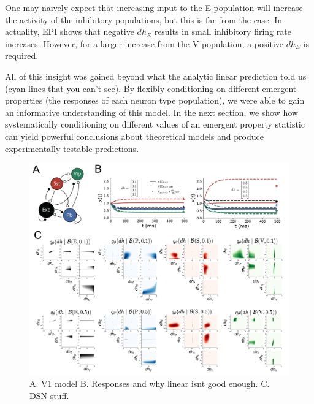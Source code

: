 \documentclass[11pt]{article}
\begin{document}
One may naively expect that increasing input to the E-population will increase the activity of the inhibitory populations, but this is far from the case. In actuality, EPI shows that negative $dh_E$ results in small inhibitory firing rate increases.  However, for a larger increase from the V-population, a positive $dh_E$ is required.

All of this insight was gained beyond what the analytic linear prediction told us (cyan lines that you can't see).  
By flexibly conditioning on different emergent properties (the responses of each neuron type population), we were able to gain an informative understanding of this model.
In the next section, we show how systematically conditioning on different values of an emergent property statistic can yield powerful conclusions about theoretical models and produce experimentally testable predictions.

\begin{figure}
\begin{center}
\includegraphics[scale=0.5]{figs/fig3/fig3.pdf}
\end{center}
\caption{A. V1 model B. Responses and why linear isnt good enough. C. DSN stuff.}
\end{figure}
\end{document}

